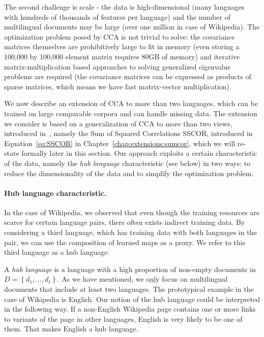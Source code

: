 The second challenge is scale - the data is high-dimensional (many languages with
hundreds of thousands of features per language) and the number of multilingual documents may 
be large (over one million in case of Wikipedia). The optimization problem posed by CCA is not trivial 
to solve: the covariance matrices themselves are prohibitively
large to fit in memory (even storing a 100,000 by 100,000 element matrix requires 
80GB of memory) and iterative matrix-multiplication based approaches to solving generalized 
eigenvalue problems are required (the covariance matrices can be expressed as products 
of sparse matrices, which means we have fast matrix-vector multiplication).

We now describe an extension of CCA to more than two languages, which can be trained on 
large comparable corpora and can handle missing data. The extension we consider is based on 
a generalization of CCA to more than two views, introduced in~\cite{Kettenring}, namely 
the Sum of Squared Correlations SSCOR, introduced in Equation~\ref{eq:SSCOR} in 
Chapter~\ref{chap:extensions:sumcor}, which we will re-state formally later in this section. 
Our approach exploits a certain characteristic of the data, namely the \emph{hub language} 
characteristic (see below) in two ways: to reduce the dimensionality of the data and to 
simplify the optimization problem.

\paragraph{Hub language characteristic.}
In the case of Wikipedia, we observed that even though the training resources are scarce 
for certain language pairs, there often exists indirect training data. By considering 
a third language, which has training data with both languages in the pair,  we can use 
the composition of learned maps as a proxy. We refer to this third language as a hub language.

A \emph{hub language} is a language with a high proportion of non-empty documents in 
$D = \left\{d_1,..., d_{\ell}\right\}$. As we have mentioned, we only focus on multilingual 
documents that include at least two languages. The prototypical example in the case of 
Wikipedia is English. Our notion of the hub language could be interpreted in the following 
way. If a non-English Wikipedia page contains one or more links to variants of the page in 
other languages, English is very likely to be one of them. That makes English a hub language.

